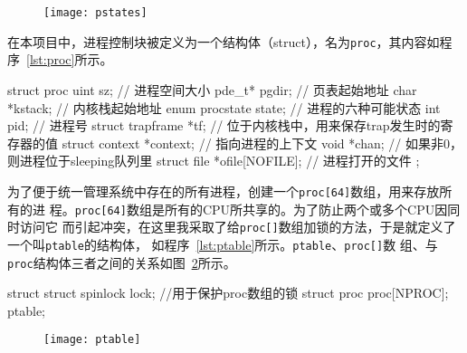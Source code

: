 \documentclass{swfuthesism}
\begin{document}
\begin{figure}[!htb]
  \centering
  \vspace*{2ex}
  \begin{center}
    \texttt{[image: pstates]}
  \end{center}
  \label{fig:pstates}
\end{figure}

在本项目中，进程控制块被定义为一个结构体（struct），名为\texttt{proc}，其内容如程
序~\ref{lst:proc}所示。

\begin{listing}
  \begin{codeblock}
\begin{ccode}
struct proc {
  uint sz;                 // 进程空间大小
  pde_t* pgdir;            // 页表起始地址
  char *kstack;            // 内核栈起始地址
  enum procstate state;    // 进程的六种可能状态
  int pid;                 // 进程号
  struct trapframe *tf;    // 位于内核栈中，用来保存trap发生时的寄存器的值
  struct context *context; // 指向进程的上下文
  void *chan;              // 如果非0，则进程位于sleeping队列里
  struct file *ofile[NOFILE]; // 进程打开的文件
};
\end{ccode}
  \end{codeblock}
  \label{lst:proc}
\end{listing}

为了便于统一管理系统中存在的所有进程，创建一个\texttt{proc[64]}数组，用来存放所有的进
程。\texttt{proc[64]}数组是所有的CPU所共享的。为了防止两个或多个CPU因同时访问它
而引起冲突，在这里我采取了给\texttt{proc[]}数组加锁的方法，于是就定义了一个叫\texttt{ptable}的结构体，
如程序~\ref{lst:ptable}所示。\texttt{ptable}、\texttt{proc[]}数
组、与\texttt{proc}结构体三者之间的关系如图~\ref{fig:ptable}所示。

\begin{listing}%
  \begin{codeblock}
\begin{ccode}
struct {
  struct spinlock lock; //用于保护proc数组的锁
  struct proc proc[NPROC];
} ptable;
\end{ccode}
  \end{codeblock}
\label{lst:ptable}
\end{listing}

\begin{figure}[!htb]
  \centering
  \texttt{[image: ptable]}
  \label{fig:ptable}
\end{figure}
\end{document}
